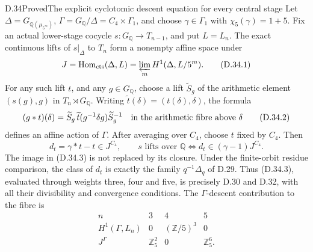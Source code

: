 \begin{statement}{D.34}{Proved}{The explicit cyclotomic descent equation for every central stage}
Let \(\Delta=G_{\mathbb Q(\mu_{5^\infty})}\),
\(\Gamma=G_{\mathbb Q}/\Delta=C_4\times\Gamma_1\),
and choose \(\gamma\in\Gamma_1\) with
\(\chi_5(\gamma)=1+5\). Fix an actual
lower-stage cocycle \(s:G_{\mathbb Q}\to T_{n-1}\),
and put \(L=L_n\). The exact continuous lifts
of \(s|_\Delta\) to \(T_n\) form a nonempty
affine space under
\[
          J=\operatorname{Hom}_{\rm cts}(\Delta,L)
            =\varprojlim_m H^1(\Delta,L/5^m).
                                                        \tag{D.34.1}
\]
For any such lift \(t\), and any \(g\in G_{\mathbb Q}\),
choose a lift \(\widetilde S_g\) of the arithmetic
element \((s(g),g)\) in \(T_n\rtimes G_{\mathbb Q}\).
Writing \(\widetilde t(\delta)=(t(\delta),\delta)\),
the formula
\[
 (g*t)(\delta)=
 \widetilde S_g\,\widetilde t(g^{-1}\delta g)
       \widetilde S_g^{-1}
 \quad\hbox{in the arithmetic fibre above }\delta
                                                        \tag{D.34.2}
\]
defines an affine action of \(\Gamma\).
After averaging over \(C_4\), choose \(t\) fixed
by \(C_4\). Then
\[
        d_t=\gamma*t-t\in J^{C_4},\qquad
 s\text{ lifts over }\mathbb Q
   \Longleftrightarrow
       d_t\in(\gamma-1)J^{C_4}.                 \tag{D.34.3}
\]
The image in (D.34.3) is not replaced by its
closure. Under the finite-orbit residue
comparison, the class of \(d_t\) is exactly
the family \(q^{-1}\Delta_q\) of D.29.
Thus (D.34.3), evaluated through weights three,
four and five, is precisely D.30 and D.32,
with all their divisibility and convergence
conditions. The \(\Gamma\)-descent contribution
to the fibre is
\[
 \begin{array}{c|ccc}
       n&3&4&5\\\hline
 H^1(\Gamma,L_n)&0&(\mathbb Z/5)^3&0\\
 J^\Gamma&\mathbb Z_5^2&0&\mathbb Z_5^6 .
 \end{array}                                             \tag{D.34.4}
\]
\end{statement}

